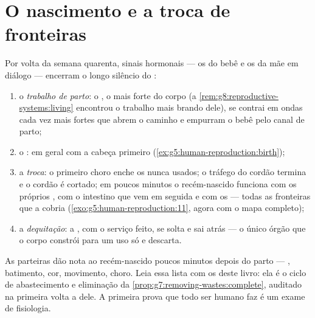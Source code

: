 \section{O nascimento e a troca de fronteiras}

\begin{proposition}\label{prop:g8:from-egg-to-birth:birth}
Por volta da semana quarenta, sinais hormonais --- os do bebê e os da
mãe em diálogo --- encerram o longo silêncio do :
\begin{enumerate}
  \item o \emph{trabalho de parto}: o , o  mais forte do
        corpo (a \cref{rem:g8:reproductive-systems:living} encontrou o
        trabalho mais brando dele), se contrai em ondas cada vez mais
        fortes que abrem o caminho e empurram o bebê pelo canal de
        parto;
  \item o \emph{}: em geral com a cabeça primeiro
        (\cref{ex:g5:human-reproduction:birth});
  \item a \emph{troca}: o primeiro choro enche os  nunca
        usados; o tráfego do cordão termina e o cordão é cortado; em
        poucos minutos o recém-nascido funciona com os próprios
        , com o intestino que vem em seguida e com os  ---
        todas as fronteiras que a  cobria
        (\cref{exo:g5:human-reproduction:11}, agora com o mapa
        completo);
  \item a \emph{dequitação}: a , com o serviço feito, se
        solta e sai atrás --- o único órgão que o corpo constrói para
        um uso só e descarta.
\end{enumerate}
\end{proposition}
\admitted

\begin{example}\label{ex:g8:from-egg-to-birth:audit}
As parteiras dão nota ao recém-nascido poucos minutos depois do parto
--- , batimento, cor, movimento, choro. Leia essa lista com
os  deste livro: ela é o ciclo de abastecimento e eliminação da
\cref{prop:g7:removing-wastes:complete}, auditado na primeira volta a
 dele. A primeira prova que todo ser humano faz é um exame de
fisiologia.
\end{example}

